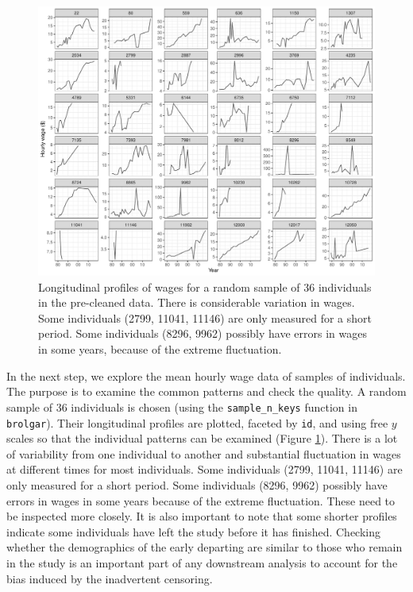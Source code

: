 \documentclass[12pt]{article}
\begin{document}
\begin{figure}

{\centering \includegraphics[width=1\linewidth]{figures/sample-plot-1} 

}

\caption{Longitudinal profiles of wages for a random sample of 36 individuals in the pre-cleaned data. There is considerable variation in wages. Some individuals  (2799, 11041, 11146) are only measured for a short period. Some individuals (8296, 9962) possibly have errors in wages in some years, because of the extreme fluctuation.}\label{fig:sample-plot}
\end{figure}

In the next step, we explore the mean hourly wage data of samples of individuals. The purpose is to examine the common patterns and check the quality. A random sample of 36 individuals is chosen (using the \texttt{sample\_n\_keys} function in \texttt{brolgar}). Their longitudinal profiles are plotted, faceted by \texttt{id}, and using free \(y\) scales so that the individual patterns can be examined (Figure \ref{fig:sample-plot}). There is a lot of variability from one individual to another and substantial fluctuation in wages at different times for most individuals. Some individuals (2799, 11041, 11146) are only measured for a short period. Some individuals (8296, 9962) possibly have errors in wages in some years because of the extreme fluctuation. These need to be inspected more closely. It is also important to note that some shorter profiles indicate some individuals have left the study before it has finished. Checking whether the demographics of the early departing are similar to those who remain in the study is an important part of any downstream analysis to account for the bias induced by the inadvertent censoring.
\end{document}

